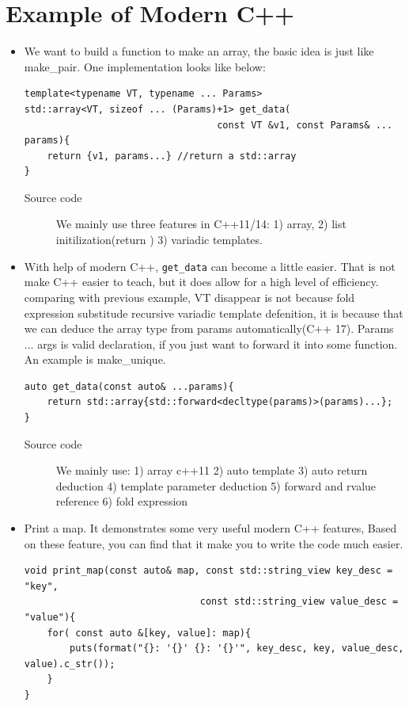 \documentclass[a4paper,11pt,twoside]{book}
\begin{document}
\section{Example of Modern C++}
\begin{itemize}
    
	\item We want to build a function to make an array, the basic idea is just like make\_pair. One implementation looks like below:

\begin{lstlisting}
template<typename VT, typename ... Params>
std::array<VT, sizeof ... (Params)+1> get_data(
                                  const VT &v1, const Params& ... params){
	return {v1, params...} //return a std::array
}
\end{lstlisting}	

\begin{description}
	\item[Source code] We mainly use three features in C++11/14: 1) array, 2) list initilization(return ) 3) variadic templates.  
\end{description}

\item With help of modern C++, \texttt{get\_data} can become a little easier. That is not make C++ easier to teach, but it does allow for a high level of efficiency. comparing with previous example, VT disappear is not because fold expression substitude recursive variadic template defenition, it is because that we can deduce the array type from params automatically(C++ 17). Params ... args is valid declaration, if you just want to forward it into some function. An example is make\_unique. 
\begin{lstlisting}
auto get_data(const auto& ...params){
	return std::array{std::forward<decltype(params)>(params)...};
}
\end{lstlisting}
\begin{description}
    \item[Source code] We mainly use: 1) array c++11 2) auto template 3) auto return deduction 4) template parameter deduction 5) forward and rvalue reference 6) fold expression
\end{description}


	\item Print a map. It demonstrates some very useful modern C++ features, Based on these feature, you can find that it make you to write the code much easier. 
\begin{lstlisting}
void print_map(const auto& map, const std::string_view key_desc = "key",
							   const std::string_view value_desc = "value"){
	for( const auto &[key, value]: map){
		puts(format("{}: '{}' {}: '{}'", key_desc, key, value_desc, value).c_str());
	}		   
}
\end{lstlisting}	


\end{itemize}
\end{document}
